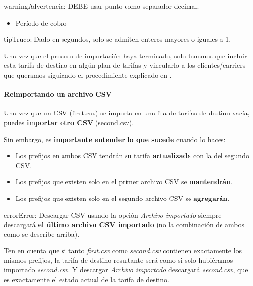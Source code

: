 \documentclass[letterpaper,10pt,spanish]{sphinxmanual}
\begin{document}
\begin{notice}{warning}{Advertencia:}
DEBE usar punto como separador decimal.
\end{notice}
\begin{itemize}
\item {} 
Período de cobro

\end{itemize}

\begin{notice}{tip}{Truco:}
Dado en segundos, solo se admiten enteros mayores o iguales a 1.
\end{notice}

Una vez que el proceso de importación haya terminado, solo tenemos que incluir esta tarifa de destino en algún plan de tarifas y vincularlo a los clientes/carriers que queramos siguiendo el procedimiento explicado en {\hyperref[administration_portal/brand/billing/rating_plans:rating\string-plans]{}}.


\paragraph{Reimportando un archivo CSV}
\label{administration_portal/brand/billing/destination_rates:re-importing-a-csv-file}
Una vez que un CSV (first.csv) se importa en una fila de tarifas de destino vacía, puedes \textbf{importar otro CSV} (second.csv).

Sin embargo, es \textbf{importante entender lo que sucede} cuando lo haces:
\begin{itemize}
\item {} 
Los prefijos en ambos CSV tendrán su tarifa \textbf{actualizada} con la del segundo CSV.

\item {} 
Los prefijos que existen solo en el primer archivo CSV se \textbf{mantendrán}.

\item {} 
Los prefijos que existen solo en el segundo archivo CSV se \textbf{agregarán}.

\end{itemize}

\begin{notice}{error}{Error:}
Descargar CSV usando la opción \emph{Archivo importado} siempre descargará \textbf{el último archivo CSV importado} (no la combinación de ambos como se describe arriba).
\end{notice}

Ten en cuenta que si tanto \emph{first.csv} como \emph{second.csv} contienen exactamente los mismos prefijos, la tarifa de destino resultante será como si solo hubiéramos importado \emph{second.csv}. Y descargar \emph{Archivo importado} descargará \emph{second.csv}, que es exactamente el estado actual de la tarifa de destino.
\end{document}
